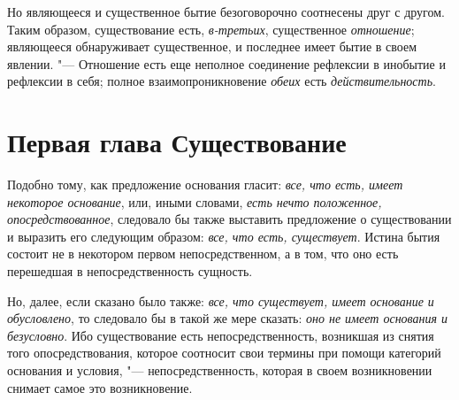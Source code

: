 Но являющееся и существенное бытие безоговорочно соотнесены друг с другом.
Таким образом, существование есть, {\em в-третьих},
существенное {\em отношение}; являющееся обнаруживает
существенное, и последнее имеет бытие в своем явлении. "--- Отношение есть еще
неполное соединение рефлексии в инобытие и рефлексии в себя; полное
взаимопроникновение {\em обеих} есть {\em действительность}.

\chapter[{\em Первая глава} Существование]{Первая глава Существование}

Подобно тому, как предложение основания гласит:
{\em все, что есть, имеет некоторое основание}, или,
иными словами, {\em есть нечто положенное,
опосредствованное}, следовало бы также выставить предложение о
существовании и выразить его следующим образом:
{\em все, что есть, существует}. Истина бытия состоит
не в некотором первом непосредственном, а в том, что оно есть перешедшая в
непосредственность сущность.

Но, далее, если сказано было также: {\em все, что
существует, имеет основание и обусловлено}, то следовало бы в такой же мере
сказать: {\em оно не имеет основания и безусловно}. Ибо
существование есть непосредственность, возникшая из снятия того
опосредствования, которое соотносит свои термины при помощи категорий
основания и условия, "--- непосредственность, которая в своем возникновении
снимает самое это возникновение.


